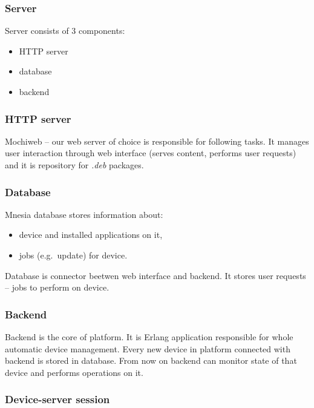 \subsubsection*{Server}

Server consists of 3 components:
\begin{itemize}
  \item HTTP server
  \item database
  \item backend
\end{itemize}


\subsubsection*{HTTP server}

Mochiweb -- our web server of choice is responsible for following tasks. It manages user interaction
through web interface (serves content, performs user requests) and it is repository for \emph{.deb}
packages.


\subsubsection*{Database}

Mnesia database stores information about:
\begin{itemize}
  \item device and installed applications on it,
  \item jobs (e.g.\ update) for device.
\end{itemize}

\noindent Database is connector beetwen web interface and backend. It stores user requests -- jobs to perform
on device.


\subsubsection*{Backend}

Backend is the core of platform. It is Erlang application responsible for whole automatic device
management. Every new device in platform connected with backend is stored in database.
From now on backend can monitor state of that device and performs operations on it.

\subsubsection{Device-server session}

